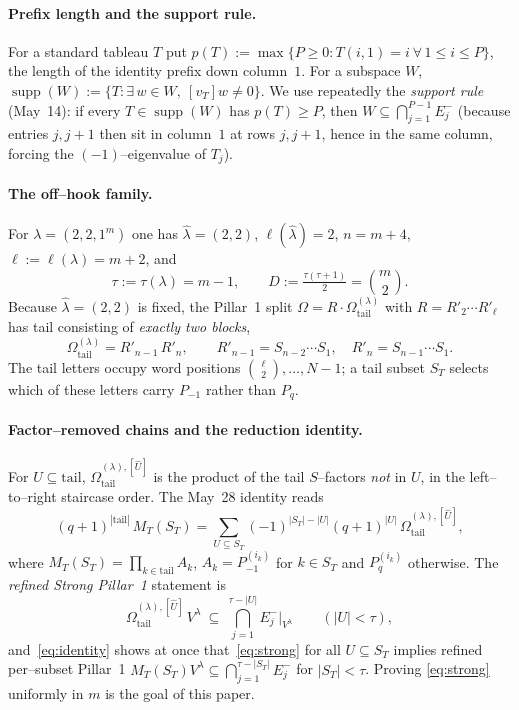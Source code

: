 \documentclass[11pt]{article}
\theoremstyle{definition}
\DeclareMathOperator{\supp}{supp}
\newcommand{\Vlam}{V^\lambda}
\newcommand{\Rp}{{R'}}
\newcommand{\Em}[1]{E^{-}_{#1}}
\newcommand{\Om}{\Omega^{(\lambda)}_{\mathrm{tail}}}
\newcommand{\OmU}{\Omega^{(\lambda),[\widehat U]}_{\mathrm{tail}}}
\newcommand{\hatl}{\widehat\lambda}
\newcommand{\Pq}{P_{q}}
\newcommand{\Pm}{P_{-1}}
\begin{document}
\paragraph{Prefix length and the support rule.}
For a standard tableau $T$ put $p(T):=\max\{P\ge0: T(i,1)=i\ \forall\,1\le i\le P\}$, the
length of the identity prefix down column~$1$. For a subspace $W$,
$\supp(W):=\{T:\exists\,w\in W,\ [v_T]w\neq0\}$. We use repeatedly the
\emph{support rule} (May~14): if every $T\in\supp(W)$ has $p(T)\ge P$, then
$W\subseteq\bigcap_{j=1}^{P-1}\Em j$ (because entries $j,j+1$ then sit in column~$1$ at
rows $j,j+1$, hence in the same column, forcing the $(-1)$--eigenvalue of $T_j$).

\paragraph{The off--hook family.}
For $\lambda=(2,2,1^m)$ one has $\hatl=(2,2)$, $\ell(\hatl)=2$, $n=m+4$,
$\ell:=\ell(\lambda)=m+2$, and
\[
   \tau:=\tau(\lambda)=m-1,\qquad D:=\tfrac{\tau(\tau+1)}2=\binom m2 .
\]
Because $\hatl=(2,2)$ is fixed, the Pillar~1 split $\Omega=R\cdot\Om$ with
$R=\Rp_2\cdots\Rp_\ell$ has tail consisting of \emph{exactly two blocks},
\[
   \Om=\Rp_{n-1}\,\Rp_n,\qquad
   \Rp_{n-1}=S_{n-2}\cdots S_1,\quad \Rp_n=S_{n-1}\cdots S_1 .
\]
The tail letters occupy word positions $\binom{\ell}{2},\dots,N-1$; a tail subset
$S_T$ selects which of these letters carry $\Pm$ rather than $\Pq$.

\paragraph{Factor--removed chains and the reduction identity.}
For $U\subseteq\mathrm{tail}$, $\OmU{}$ is the product of the tail
$S$--factors \emph{not} in $U$, in the left--to--right staircase order. The May~28
identity reads
\begin{equation}\label{eq:identity}
   (q+1)^{|\mathrm{tail}|}\,M_T(S_T)
   =\sum_{U\subseteq S_T}(-1)^{|S_T|-|U|}(q+1)^{|U|}\,\OmU{},
\end{equation}
where $M_T(S_T)=\prod_{k\in\mathrm{tail}}A_k$, $A_k=\Pm^{(i_k)}$ for $k\in S_T$ and
$\Pq^{(i_k)}$ otherwise. The \emph{refined Strong Pillar~1} statement is
\begin{equation}\label{eq:strong}
   \OmU{}\,\Vlam\ \subseteq\ \bigcap_{j=1}^{\tau-|U|}\Em j\Big|_{\Vlam}
   \qquad(|U|<\tau),
\end{equation}
and~\eqref{eq:identity} shows at once that~\eqref{eq:strong} for all $U\subseteq S_T$
implies refined per--subset Pillar~1
$M_T(S_T)\Vlam\subseteq\bigcap_{j=1}^{\tau-|S_T|}\Em j$ for $|S_T|<\tau$. Proving
\eqref{eq:strong} uniformly in $m$ is the goal of this paper.
\end{document}

